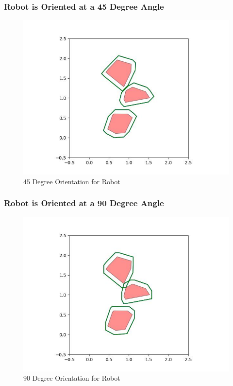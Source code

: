 \documentclass{article}
\begin{document}
\newpage
\subsubsection{Robot is Oriented at a 45 Degree Angle}
\begin{figure}[h!]
	\includegraphics[width= 0.9 \linewidth]{Problem3_minkowski7_45.jpg}
	\centering
	\caption{45 Degree Orientation for Robot}
	\label{Problem3_minkowski7_45.jpg}
\end{figure}

\newpage
\subsubsection{Robot is Oriented at a 90 Degree Angle}
\begin{figure}[h!]
	\includegraphics[width= 0.9 \linewidth]{Problem3_minkowski7_90.jpg}
	\centering
	\caption{90 Degree Orientation for Robot}
	\label{Problem3_minkowski7_90.jpg}
\end{figure}
\end{document}
